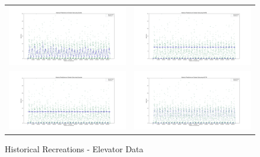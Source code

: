 \begin{figure}
  \begin{tabular}{cc}
    {\includegraphics[width = 3in]{images/results/Historical_elevator_Duckett.png}} &
    {\includegraphics[width = 3in]{images/results/Historical_elevator_FreMEn.png}} \\
    {\includegraphics[width = 3in]{images/results/Historical_elevator_Gaussian.png}} &
    {\includegraphics[width = 3in]{images/results/Historical_elevator_HyT-EM.png}} \\
  \end{tabular}
  \caption{Historical Recreations - Elevator Data}
  \label{figure:Historical_Recreations_-_Elevator_Data}
\end{figure}

